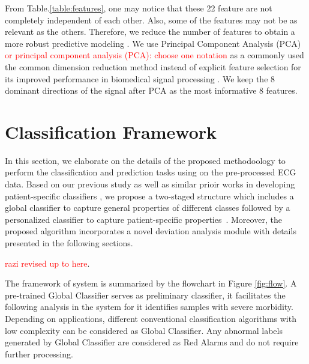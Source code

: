From Table.\ref{table:features}, one may notice that these 22 feature are not completely independent of each other. Also, some of the features may not be as relevant as the others. Therefore, we reduce the number of features to obtain a more robust predictive modeling \cite{Some references for feature selection}. We use Principal Component Analysis (PCA) \textcolor{red}{or principal component analysis (PCA): choose one notation} as a commonly used the common dimension reduction method instead of explicit feature selection for its improved performance in biomedical signal processing \cite{Some references for PCA as a dimension reduction method}. We keep the 8 dominant directions of the signal after PCA as the most informative 8 features.



\section{Classification Framework}

In this section, we elaborate on the details of the proposed methodoology to perform the classification and prediction tasks using on the pre-processed ECG data. Based on our previous study \cite{chen2018predictive} as well as similar prioir works in developing patient-specific classifiers \cite{Hu_et_al,deChazal2006,llamedo2012automatic}, we propose a two-staged structure which includes a global classifier to capture general properties of different classes followed by a personalized classifier to capture patient-specific properties~\cite{chen2018predictive,Hu_et_al,deChazal2006,llamedo2012automatic}. Moreover, the proposed algorithm incorporates a novel deviation analysis module with details presented in the following sections. 

\textcolor{red}{razi revised up to here}.

The framework of system is summarized by the flowchart in Figure \ref{fig:flow}. A pre-trained Global Classifier serves as preliminary classifier, it facilitates the following analysis in the system for it identifies samples with severe morbidity. Depending on applications, different conventional classification algorithms with low complexity can be considered as Global Classifier. Any abnormal labels generated by Global Classifier are considered as Red Alarms and do not require further processing.

